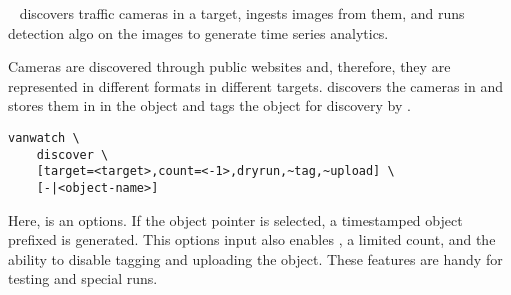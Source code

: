 ~\cite{vanwatch} discovers traffic cameras in a target, ingests images from them, and runs detection algo on the images to generate time series analytics.

Cameras are discovered through public websites and, therefore, they are represented in different formats in different targets.  discovers the cameras in  and stores them in  in the object  and tags the object for discovery by .
%
\begin{graybox}
\begin{verbatim}
vanwatch \
    discover \
    [target=<target>,count=<-1>,dryrun,~tag,~upload] \
    [-|<object-name>]
\end{verbatim}
\end{graybox}
%
Here,  is an options. If the object pointer \keyword{-} is selected, a timestamped object prefixed  is generated. This options input also enables , a limited count, and the ability to disable tagging and uploading the object. These features are handy for testing and special runs.

